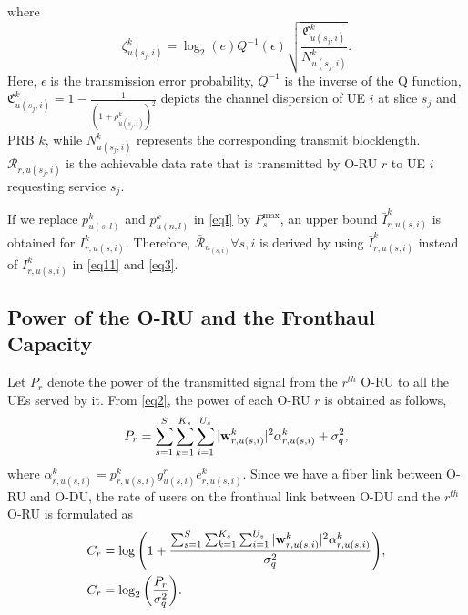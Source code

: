 \documentclass[lettersize,journal]{IEEEtran}
\begin{document}
where %
\begin{equation}\label{shortPacket}
 \zeta_{u(s_j,i)}^{k} = \log_2({e})Q^{-1}(\epsilon) \sqrt{\frac{\mathfrak{C}_{u(s_j,i)}^{k}}{N_{u(s_j,i)}^{k}}}.
\end{equation}
Here, $\epsilon$ is the transmission error probability, $Q^{-1}$ is the inverse of the Q function,
$\mathfrak{C}_{u(s_j,i)}^{k} = 1 - \frac{1}{(1+\rho_{u(s_j,i)}^{k})^2}$ depicts the channel dispersion of UE  $i$ at slice $s_j$ and PRB $k$, while
$N_{u(s_j,i)}^{k}$ represents the corresponding transmit blocklength.
$\mathcal{R}_{r,u(s_j,i)}$ is the achievable data rate that is transmitted by O-RU $r$ to UE $i$ requesting service $s_j$.

If we replace $p_{u(s,l)}^{k}$ and $p_{u(n,l)}^{k}$ in \eqref{eqI} by $P_{s}^{\text{max}}$, an upper bound $\bar{I}_{r,u(s,i)}^{k}$ is obtained for $I_{r,u(s,i)}^{k}$. Therefore, $\bar{\mathcal{R}}_{u_{(s,i)}} \forall s , i$ is derived by using $\bar{I}_{r,u(s,i)}^{k}$ instead of $I_{r,u(s,i)}^{k}$ in  \eqref{eq11} and \eqref{eq3}.
\subsection{Power of the O-RU and the Fronthaul Capacity}
Let $P_r$ denote the power of the transmitted signal from the $r^{th}$ O-RU to all the UEs served by it. From \eqref{eq2}, the power of each O-RU $r$ is obtained as follows,
\begin{equation}\label{pr}
P_r = \sum_{s=1}^{S}\sum_{k=1}^{K_s}\sum_{i=1}^{U_s}|\bold{w}_{r,u(s,i)}^{k}|^2\alpha^k_{r,u(s,i)} + \sigma_{q}^2,
\end{equation}
where $\alpha^k_{r,u(s,i)}= p_{r,u(s,i)}^{k} g_{u(s,i)}^r e^k_{r,u(s,i)}$.
Since we have a fiber link between O-RU and O-DU, the rate of users on the fronthual link between O-DU and the $r^{th}$ O-RU  is formulated as
\begin{align}\label{cr}
C_{r} &= \log{\left(1+ \frac{\sum_{s=1}^{S}\sum_{k=1}^{K_s}\sum_{i=1}^{U_s}|\bold{w}_{r,u(s,i)}^{k}|^2 \mathcal{\alpha}^k_{r,u(s,i)} }{ \sigma_{q}^2}\right)},\nonumber\\
C_{r} &= \log_2{\left(\frac{P_r}{ \sigma_{q}^2}\right)}.
\end{align}
\end{document}
